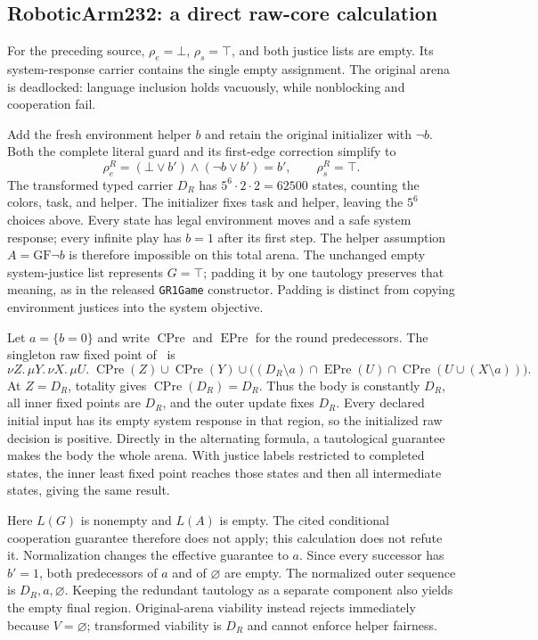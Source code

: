 \documentclass[11pt]{article}
\begin{document}
\subsection{RoboticArm232: a direct raw-core calculation}
\label{app:roboticarm232-raw}
For the preceding source, $\rho_e=\bot$, $\rho_s=\top$, and both justice
lists are empty. Its system-response carrier contains the single empty
assignment. The original arena is deadlocked: language inclusion holds
vacuously, while nonblocking and cooperation fail.

Add the fresh environment helper $b$ and retain the original initializer
with $\neg b$. Both the complete literal guard and its first-edge
correction simplify to
\[
 \rho_e^R=(\bot\lor b')\land(\neg b\lor b')=b',
 \qquad \rho_s^R=\top.
\]
The transformed typed carrier $D_R$ has $5^6\cdot2\cdot2=62500$ states,
counting the colors, task, and helper. The initializer fixes task and
helper, leaving the $5^6$ choices above. Every state has
legal environment moves and a safe system response; every infinite play
has $b=1$ after its first step. The helper assumption
$A=\mathrm{GF}\neg b$ is therefore impossible on this total arena.
The unchanged empty system-justice list represents $G=\top$; padding
it by one tautology preserves that meaning, as in the released
\texttt{GR1Game} constructor. Padding is distinct from copying
environment justices into the system objective.

Let $a=\{b=0\}$ and write $\operatorname{CPre}$ and $\operatorname{EPre}$ for the round predecessors.
The singleton raw fixed point of~\cite[Eqs.~(9),~(15)]{friendly} is
\[
 \nu Z.\,\mu Y.\,\nu X.\,\mu U.\;
 \operatorname{CPre}(Z)\cup\operatorname{CPre}(Y)\cup
 \bigl((D_R\setminus a)\cap\operatorname{EPre}(U)
       \cap\operatorname{CPre}(U\cup(X\setminus a))\bigr).
\]
At $Z=D_R$, totality gives $\operatorname{CPre}(D_R)=D_R$. Thus the body is constantly $D_R$,
all inner fixed points are $D_R$, and the outer update fixes $D_R$.
Every declared initial input has its empty system response in that region,
so the initialized raw decision is positive. Directly in the alternating
formula, a tautological guarantee makes the body the whole arena.
With justice labels restricted to completed states, the inner least
fixed point reaches those states and then all intermediate states,
giving the same result.

Here $L(G)$ is nonempty and $L(A)$ is empty. The cited conditional
cooperation guarantee therefore does not apply; this calculation does
not refute it. Normalization changes the effective guarantee to $a$.
Since every successor has $b'=1$, both predecessors of $a$ and of
$\varnothing$ are empty. The normalized outer sequence is
$D_R,a,\varnothing$. Keeping the redundant tautology as a separate
component also yields the empty final region. Original-arena viability
instead rejects immediately because $V=\varnothing$; transformed
viability is $D_R$ and cannot enforce helper fairness.
\end{document}

